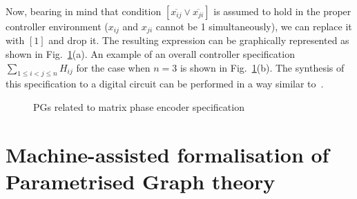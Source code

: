 Now, bearing in mind that condition $[\overline{x_{ij}}\vee\overline{x_{ji}}]$
is assumed to hold in the proper controller environment ($x_{ij}$
and $x_{ji}$ cannot be 1 simultaneously), we can replace it with
$[1]$ and drop it. The resulting expression can be graphically represented
as shown in Fig.~\ref{fig:CGs-related-to}(a). An example of an overall
controller specification ${\displaystyle \sum_{1\le i<j\le n}}H_{ij}$
for the case when $n=3$ is shown in Fig.~\ref{fig:CGs-related-to}(b).
The synthesis of this specification to a digital circuit can be performed
in a way similar to~\cite{2010_mokhov_ieee}.

\begin{figure}
\hfill{}\hfill{}\hfill{}

\caption{PGs related to matrix phase encoder specification\label{fig:CGs-related-to}}
\vspace{-6mm}
\end{figure}


\section{Machine-assisted formalisation of Parametrised Graph theory}

